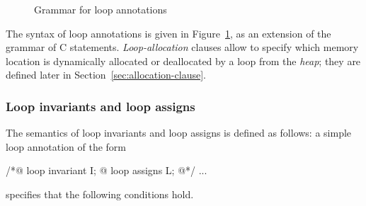 \begin{figure}[t]
  \begin{cadre}
    
  \end{cadre}
  \caption{Grammar for loop annotations}
  \label{fig:gram:loops}
\end{figure}

The syntax of loop annotations is given in Figure~\ref{fig:gram:loops},
as an extension of the grammar of C statements.
\textsl{Loop-allocation} clauses allow to specify which memory location 
is dynamically allocated or deallocated by a loop from the \textsl{heap}; 
they are defined later in Section~\ref{sec:allocation-clause}.

\subsubsection{Loop invariants and loop assigns}
\label{sec:loop-invariants}
The semantics of loop invariants and loop assigns is defined as follows: 
a simple loop annotation of the form
\begin{listing}{1}
/*@ loop invariant I;
  @ loop assigns L;
  @*/
...
\end{listing}
specifies that the following conditions hold.
